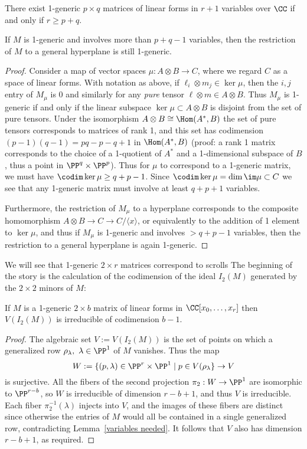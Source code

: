 \begin{lemma}\label{existence of 1-generic}\label{variables needed}
  \label{size of 1-generic} There exist 1-generic $p\times q$ matrices of linear forms in $r+1$ variables over $\CC$ if and only if $r\geq p+q$.
  
If $M$ is 1-generic and involves more than $p+q-1$ variables, then the restriction of $M$ to a general hyperplane is still 1-generic.
\end{lemma}
\begin{proof} Consider a map of vector spaces $\mu : A\otimes B \to C$, where we regard $C$ as a 
space of linear forms.
With notation as above, if $\ell_i\otimes m_j\in \ker \mu$, then the $i,j$ entry of $M_\mu$ is 0 and similarly for
any \emph{pure} tensor $\ell\otimes m\in A\otimes B$. Thus $M_\mu$ is 1-generic if and only if the linear subspace
$\ker \mu \subset  A\otimes B$
is disjoint from the set of pure tensors. Under the isomorphism $A\otimes B \cong \Hom (A^*, B)$
the set of pure tensors corresponds to matrices of rank 1, and this set has codimension $(p-1)(q-1) = pq-p-q+1$
in $\Hom(A^*, B)$ (proof: a rank 1 matrix corresponds to the choice of a 1-quotient of $A^*$ and a 1-dimensional subspace
of $B$, thus a point in $\PP^q \times \PP^p$).
Thus
for $\mu$ to correspond to a  1-generic matrix,  we must have $\codim \ker \mu \geq q+p-1$. Since $\codim \ker \mu = \dim \im \mu\subset C$ we see that any 1-generic matrix must involve at least $q+p+1$ variables. 

Furthermore, the restriction of $M_\mu$ to a hyperplane corresponds to the composite homomorphism
$A\otimes B \to C \to C/\langle x \rangle$, or equivalently to the addition of 1 element to $\ker \mu$, and thus
if $M_\mu$ is 1-generic and involves $>q+p-1$ variables, then the restriction to a general hyperplane
is again 1-generic.
\end{proof}

 
We will see that 1-generic $2\times r$ matrices correspond to scrolls The beginning of the story is the
 calculation of the codimension of the ideal $I_2(M)$ generated by the $2\times 2$ minors of $M$:

\begin{lemma}\label{codim of 2,n 1-generic}
If $M$ is a 1-generic $2\times b$ matrix of linear forms in $\CC[x_0,\dots, x_r]$ then 
  $V(I_2(M))$ is irreducible of codimension $b-1$.
\end{lemma}

\begin{proof}
The algebraic set $V :=  V(I_2(M))$ is the set of points on which a generalized row $\rho_\lambda, \ \lambda\in \PP^1$ of $M$ vanishes. Thus the map
$$
W := \{(p, \lambda) \in \PP^{r}\times \PP^{1}\mid p\in V(\rho_{\lambda}\} \to V
$$
is surjective. All the fibers of the second projection $\pi_{2}: W\to \PP^{1}$ are isomorphic to $\PP^{r-b}$, so $W$ is
irreducible of dimension $r-b+1$, and thus $V$ is irreducible. Each fiber $\pi_{2}^{-1}(\lambda)$
injects into $V$, and the images of these fibers are distinct since otherwise the entries of $M$ would all
be contained in a single generalized row, contradicting Lemma~\ref{variables needed}. It follows
that $V$ also has dimension $r-b+1$, as required.
\end{proof}


